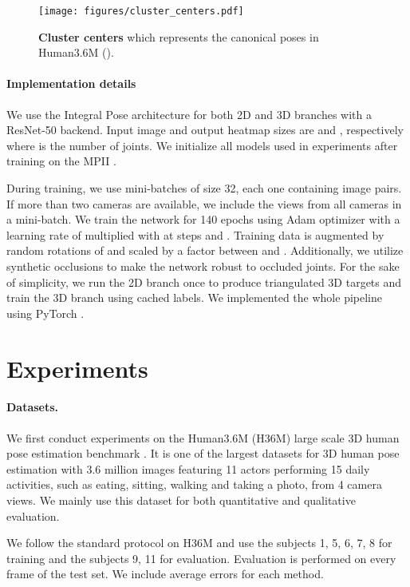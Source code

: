 \documentclass[10pt,twocolumn,letterpaper]{article}
\begin{document}
\begin{figure}
\centering
\texttt{[image: figures/cluster\_centers.pdf]}
\caption{\textbf{Cluster centers} which represents the canonical poses in Human3.6M ().}
\label{fig:atom}
\end{figure}

\paragraph{Implementation details}
We use the Integral Pose \cite{Sun_2018_ECCV} architecture for both 2D and 3D branches with a ResNet-50 \cite{He2016} backend. Input image and output heatmap sizes are  and , respectively where  is the number of joints. We initialize all models used in experiments after training on the MPII \cite{mpii}.

During training, we use mini-batches of size 32, each one containing  image pairs. If more than two cameras are available, we include the views from all cameras in a mini-batch. We train the network for 140 epochs using Adam optimizer \cite{adam} with a learning rate of  multiplied with  at steps  and . Training data is augmented by random rotations of  and scaled by a factor between  and . Additionally, we utilize synthetic occlusions \cite{Sarandi18IROSW} to make the network robust to occluded joints. For the sake of simplicity, we run the 2D branch once to produce triangulated 3D targets and train the 3D branch using cached labels. We implemented the whole pipeline using PyTorch \cite{pytorch}.
\section{Experiments}
\paragraph{Datasets.}
We first conduct experiments on the Human3.6M (H36M) large scale 3D human pose estimation benchmark \cite{h36m}. It is one of the largest datasets for 3D human pose estimation with 3.6 million images featuring 11 actors performing 15 daily activities, such as eating, sitting, walking and taking a photo, from 4 camera views. We mainly use this dataset for both quantitative and qualitative evaluation.

We follow the standard protocol on H36M and use the subjects 1, 5, 6, 7, 8 for training and the subjects 9, 11 for evaluation. Evaluation is performed on every  frame of the test set. We include average errors for each method.
\end{document}
